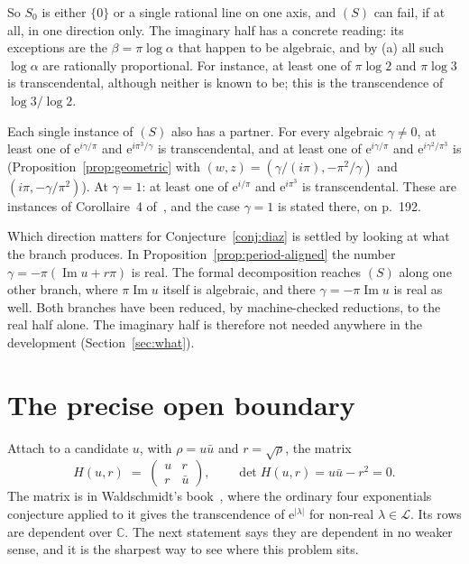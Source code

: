 \documentclass[11pt,a4paper]{article}
\theoremstyle{plain}
\theoremstyle{definition}
\newcommand{\C}{\mathbb{C}}
\newcommand{\e}{\mathrm{e}}
\newcommand{\Logs}{\mathcal{L}}
\begin{document}
So $S_{0}$ is either $\{0\}$ or a single rational line on one axis, and $(S)$ can fail, if at all,
in one direction only. The imaginary half has a concrete reading: its exceptions are the
$\beta=\pi\log\alpha$ that happen to be algebraic, and by (a) all such $\log\alpha$ are rationally
proportional. For instance, at least one of $\pi\log2$ and $\pi\log3$ is transcendental, although
neither is known to be; this is the transcendence of $\log3/\log2$.

Each single instance of $(S)$ also has a partner. For every algebraic $\gamma\neq0$, at least one
of $\e^{i\gamma/\pi}$ and $\e^{i\pi^{3}/\gamma}$ is transcendental, and at least one of
$\e^{i\gamma/\pi}$ and $\e^{i\gamma^{2}/\pi^{3}}$ is (Proposition~\ref{prop:geometric} with
$(w,z)=(\gamma/(i\pi),-\pi^{2}/\gamma)$ and $(i\pi,-\gamma/\pi^{2})$). At $\gamma=1$: at least one of
$\e^{i/\pi}$ and $\e^{i\pi^{3}}$ is transcendental. These are instances of Corollaire~4
of~\cite{waldschmidt-1973}, and the case $\gamma=1$ is stated there, on p.~192.

Which direction matters for Conjecture~\ref{conj:diaz} is settled by looking at what the branch
produces. In Proposition~\ref{prop:period-aligned} the number $\gamma=-\pi(\operatorname{Im}u+r\pi)$
is real. The formal decomposition reaches $(S)$ along one other branch, where $\pi\operatorname{Im}u$
itself is algebraic, and there $\gamma=-\pi\operatorname{Im}u$ is real as well. Both branches have
been reduced, by machine-checked reductions, to the real half alone. The imaginary half is
therefore not needed anywhere in the development (Section~\ref{sec:what}).



\section{The precise open boundary}\label{sec:boundary}

Attach to a candidate $u$, with $\rho=u\bar u$ and $r=\sqrt{\rho}$, the matrix
\[
  H(u,r)\;=\;\begin{pmatrix} u & r\\ r & \bar u\end{pmatrix},
  \qquad \det H(u,r)=u\bar u-r^{2}=0 .
\]
The matrix is in Waldschmidt's book~\cite[p.~15]{waldschmidt-book}, where the ordinary four
exponentials conjecture applied to it gives the transcendence of $\e^{\lvert\lambda\rvert}$ for
non-real $\lambda\in\Logs$. Its rows are dependent over $\C$. The next statement says they are
dependent in no weaker sense, and it is the sharpest way to see where this problem sits.
\end{document}

